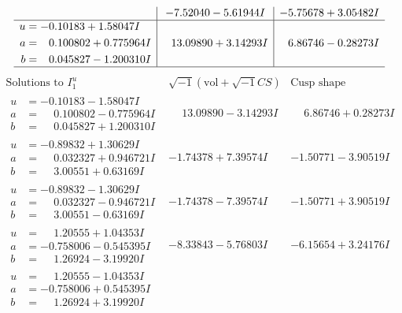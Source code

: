 \documentclass[1p]{elsarticle_modified}
\theoremstyle{definition}
\newcommand{\I}{\sqrt{-1}}
\begin{document}
$$\begin{array}{c|c|c}
 & -7.52040 - 5.61944 I & -5.75678 + 3.05482 I \\ \hline\begin{aligned}
u &= -0.10183 + 1.58047 I \\
a &= \phantom{-}0.100802 + 0.775964 I \\
b &= \phantom{-}0.045827 - 1.200310 I\end{aligned}
 & \phantom{-}13.09890 + 3.14293 I & \phantom{-}6.86746 - 0.28273 I\\
 \hline 
 \end{array}$$\newpage$$\begin{array}{c|c|c}  
\text{Solutions to }I^u_{1}& \I (\text{vol} + \sqrt{-1}CS) & \text{Cusp shape}\\
 \hline 
\begin{aligned}
u &= -0.10183 - 1.58047 I \\
a &= \phantom{-}0.100802 - 0.775964 I \\
b &= \phantom{-}0.045827 + 1.200310 I\end{aligned}
 & \phantom{-}13.09890 - 3.14293 I & \phantom{-}6.86746 + 0.28273 I \\ \hline\begin{aligned}
u &= -0.89832 + 1.30629 I \\
a &= \phantom{-}0.032327 + 0.946721 I \\
b &= \phantom{-}3.00551 + 0.63169 I\end{aligned}
 & -1.74378 + 7.39574 I & -1.50771 - 3.90519 I \\ \hline\begin{aligned}
u &= -0.89832 - 1.30629 I \\
a &= \phantom{-}0.032327 - 0.946721 I \\
b &= \phantom{-}3.00551 - 0.63169 I\end{aligned}
 & -1.74378 - 7.39574 I & -1.50771 + 3.90519 I \\ \hline\begin{aligned}
u &= \phantom{-}1.20555 + 1.04353 I \\
a &= -0.758006 - 0.545395 I \\
b &= \phantom{-}1.26924 - 3.19920 I\end{aligned}
 & -8.33843 - 5.76803 I & -6.15654 + 3.24176 I \\ \hline\begin{aligned}
u &= \phantom{-}1.20555 - 1.04353 I \\
a &= -0.758006 + 0.545395 I \\
b &= \phantom{-}1.26924 + 3.19920 I\end{aligned}

\end{array}$$
\end{document}
